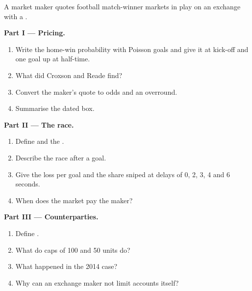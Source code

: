 \begin{problem}\label{pb:hf:prediction-and-sports-market-making:1}
A market maker quotes football match-winner markets in play on an exchange with a .

\medskip\noindent\textbf{Part I --- Pricing.}
\begin{enumerate}
\item Write the home-win probability with Poisson goals and give it at kick-off and one goal up at half-time.
\item What did Croxson and Reade find?
\item Convert the maker's quote to odds and an overround.
\item Summarise the dated box.
\end{enumerate}

\medskip\noindent\textbf{Part II --- The race.}
\begin{enumerate}[resume]
\item Define  and the .
\item Describe the race after a goal.
\item Give the loss per goal and the share sniped at delays of 0, 2, 3, 4 and 6 seconds.
\item When does the market pay the maker?
\end{enumerate}

\medskip\noindent\textbf{Part III --- Counterparties.}
\begin{enumerate}[resume]
\item Define .
\item What do caps of 100 and 50 units do?
\item What happened in the 2014  case?
\item Why can an exchange maker not limit accounts itself?
\end{enumerate}


\end{problem}
